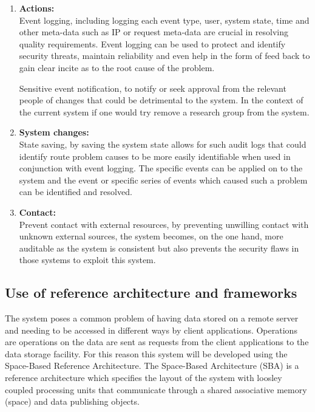 \documentclass{article}
\begin{document}
			\begin{enumerate}

				\item{\bfseries Actions:}\\

				Event logging, including logging each event type, user, system state, time and other meta-data such as IP or request meta-data are crucial in resolving quality requirements. Event logging can be used to protect and identify security threats, maintain reliability and even help in the form of feed back to gain clear incite as to the root cause of the problem.

				Sensitive event notification, to notify or seek approval from the relevant people of changes that could be detrimental to the system. In the context of the current system if one would try remove a research group from the system.

				\item{\bfseries System changes:}\\

				State saving, by saving the system state allows for such audit logs that could identify route problem causes to be more easily identifiable when used in conjunction with event logging. The specific events can be applied on to the system and the event or specific series of events which caused such a problem can be identified and resolved.

				\item{\bfseries Contact:}\\

				Prevent contact with external resources, by preventing unwilling contact with unknown external sources, the system becomes, on the one hand, more auditable as the system is consistent but also prevents the security flaws in those systems to exploit this system. 

			\end{enumerate}

\subsection{Use of reference architecture and frameworks}

The system poses a common problem of having data stored on a remote server and needing to be accessed in different ways by client applications. Operations are operations on the data are sent as requests from the client applications to the data storage facility. For this reason this system will be developed using the Space-Based Reference Architecture. The Space-Based Architecture (SBA) is a reference architecture which specifies the layout of the system with loosley coupled processing units that communicate through a shared associative memory (space) and data publishing objects.\\
\end{document}
